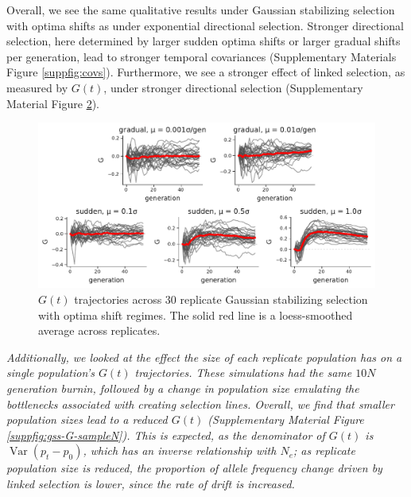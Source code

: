 \documentclass[11pt]{article}
\newcommand{\vb}[1]{{\it \color{blue} #1}}
\DeclareMathOperator{\var}{Var}
\begin{document}
{\begin{figure}[!ht]
  \label{suppfig:gss-covs}
\end{figure}

Overall, we see the same qualitative results under Gaussian stabilizing
selection with optima shifts as under exponential directional selection.
Stronger directional selection, here determined by larger sudden optima shifts
or larger gradual shifts per generation, lead to stronger temporal covariances
(Supplementary Materials Figure \ref{suppfig:covs}). Furthermore, we see a
stronger effect of linked selection, as measured by $G(t)$, under stronger
directional selection (Supplementary Material Figure \ref{suppfig:gss-G}).

\begin{figure}[!ht]
  \centering
  \includegraphics[width=\textwidth]{figures/gss-G.pdf}

  \caption{$G(t)$ trajectories across 30 replicate Gaussian stabilizing
   selection with optima shift regimes. The solid red line is a loess-smoothed
   average across replicates.}

  \label{suppfig:gss-G}
\end{figure}

\vb{Additionally, we looked at the effect the size of each replicate population
  has on a single population's $G(t)$ trajectories. These simulations had the
  same $10N$ generation burnin, followed by a change in population size
  emulating the bottlenecks associated with creating selection lines. Overall,
  we find that smaller population sizes lead to a reduced $G(t)$ (Supplementary
  Material Figure \ref{suppfig:gss-G-sampleN}). This is expected, as the
  denominator of $G(t)$ is $\var(p_t - p_0)$, which has an inverse relationship
with $N_e$; as replicate population size is reduced, the proportion of allele
frequency change driven by linked selection is lower, since the rate of drift
is increased.}


}
\end{document}

